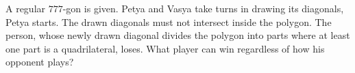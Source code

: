 \problem
A regular $777$-gon is given.
Petya and Vasya take turns in drawing its diagonals, Petya starts.
The drawn diagonals must not intersect inside the polygon.
The person, whose newly drawn diagonal divides the polygon into parts where
at least one part is a quadrilateral, loses.
What player can win regardless of how his opponent plays?
\solution
\endproblem
